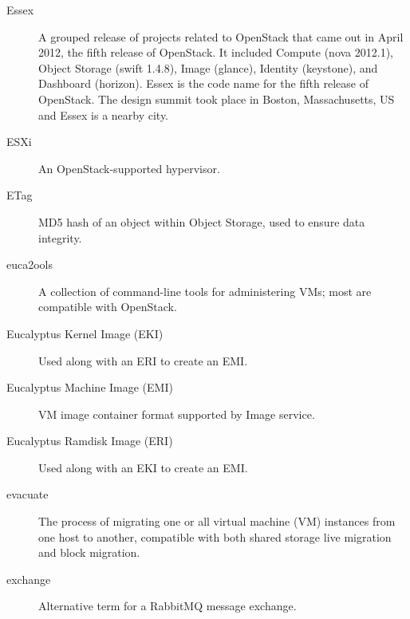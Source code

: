 \documentclass[letterpaper,10pt,english]{sphinxmanual}
\begin{document}
\begin{description}
\item[{Essex}] \leavevmode{}\label{_source/glossary:term-essex}
A grouped release of projects related to OpenStack that came out
in April 2012, the fifth release of OpenStack. It included Compute
(nova 2012.1), Object Storage (swift 1.4.8), Image (glance), Identity
(keystone), and Dashboard (horizon).
Essex is the code name for the fifth release of
OpenStack. The design summit took place in
Boston, Massachusetts, US and Essex is a nearby city.

\item[{ESXi}] \leavevmode{}\label{_source/glossary:term-esxi}
An OpenStack-supported hypervisor.

\item[{ETag}] \leavevmode{}\label{_source/glossary:term-etag}
MD5 hash of an object within Object Storage, used to ensure data
integrity.

\item[{euca2ools}] \leavevmode{}\label{_source/glossary:term-euca2ools}
A collection of command-line tools for administering VMs; most
are compatible with OpenStack.

\item[{Eucalyptus Kernel Image (EKI)}] \leavevmode{}\label{_source/glossary:term-eucalyptus-kernel-image-eki}
Used along with an ERI to create an EMI.

\item[{Eucalyptus Machine Image (EMI)}] \leavevmode{}\label{_source/glossary:term-eucalyptus-machine-image-emi}
VM image container format supported by Image service.

\item[{Eucalyptus Ramdisk Image (ERI)}] \leavevmode{}\label{_source/glossary:term-eucalyptus-ramdisk-image-eri}
Used along with an EKI to create an EMI.

\item[{evacuate}] \leavevmode{}\label{_source/glossary:term-evacuate}
The process of migrating one or all virtual machine (VM)
instances from one host to another, compatible with both shared
storage live migration and block migration.

\item[{exchange}] \leavevmode{}\label{_source/glossary:term-exchange}
Alternative term for a RabbitMQ message exchange.


\end{description}
\end{document}
